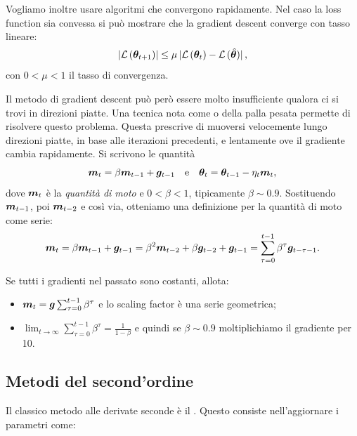 \documentclass[10pt]{article}
\begin{document}
    Vogliamo inoltre usare algoritmi che convergono rapidamente. Nel caso la loss function
    sia convessa si può mostrare che la gradient descent converge con tasso lineare:
    \begin{equation}
        \left| \mathcal{L}\left( \ve{\theta}_{t+1} \right) \right| \leq \mu \left| \mathcal{L}\left( \ve{\theta}_t \right) - \mathcal{L}\left( \shat{\ve{\theta}} \right) \right|,
    \end{equation}
    con \( 0 < \mu < 1 \) il tasso di convergenza.

    Il metodo di gradient descent può però essere molto insufficiente qualora
    ci si trovi in direzioni piatte. Una tecnica nota come  o
    della palla pesata permette di risolvere questo problema. Questa prescrive di muoversi
    velocemente lungo direzioni piatte, in base alle iterazioni precedenti,
    e lentamente ove il gradiente cambia rapidamente. Si scrivono le quantità
    \begin{equation}
        \bm{m}_t = \beta \bm{m}_{t-1} + \bm{g}_{t-1} \quad\text{e}\quad \bm{\theta}_t = \bm{\theta}_{t-1} - \eta_t \bm{m}_t,
    \end{equation}
    dove \( \bm{m}_t \) è la \textit{quantità di moto} e \( 0 < \beta < 1 \),
    tipicamente \( \beta \sim 0.9 \). Sostituendo \( \bm{m}_{t-1} \), poi \( \bm{m}_{t-2} \)
    e così via, otteniamo una definizione per la quantità di moto come serie:
    \begin{equation}
        \bm{m}_t = \beta \bm{m}_{t-1} + \bm{g}_{t-1} = \beta^2 \bm{m}_{t-2} + \beta \bm{g}_{t-2} + \bm{g}_{t-1}
        = \sum_{\tau=0}^{t-1} \beta^\tau \bm{g}_{t-\tau-1}.
    \end{equation}

    Se tutti i gradienti nel passato sono costanti, allota:
    \begin{itemize}
        \item \( \bm{m}_t = \bm{g}\sum_{\tau=0}^{t-1} \beta^\tau \) e lo scaling factor è una serie geometrica;
        \item \( \lim_{t\rightarrow\infty} \sum_{\tau=0}^{t-1}\beta^\tau = \frac{1}{1-\beta} \) e quindi se \( \beta \sim 0.9 \)
            moltiplichiamo il gradiente per 10.
    \end{itemize}

\subsection{Metodi del second'ordine}
    Il classico metodo alle derivate seconde è il . Questo consiste
    nell'aggiornare i parametri come:
    \begin{equation}
        
    \end{equation}
\end{document}
